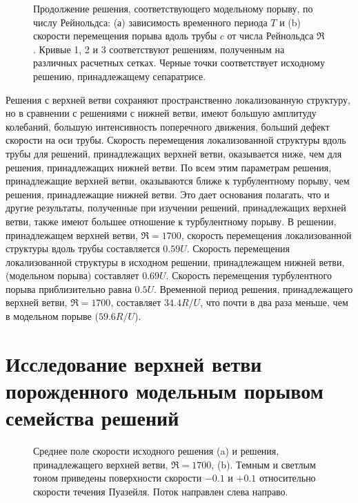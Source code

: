 \begin{figure}
\caption{Продолжение решения, соответствующего модельному порыву, по числу Рейнольдса: (а) зависимость временного периода $T$ и (b) скорости перемещения порыва вдоль трубы $c$ от числа Рейнольдса $\Re$. Кривые 1, 2 и 3 соответствуют решениям, полученным на различных расчетных сетках. Черные точки соответствует исходному решению, принадлежащему сепаратрисе.}
\label{local_contin_pic}
\end{figure}

Решения с верхней ветви сохраняют пространственно локализованную структуру, но в сравнении с решениями с нижней ветви, имеют большую амплитуду колебаний, большую интенсивность поперечного движения, больший дефект скорости на оси трубы. Скорость перемещения локализованной структуры вдоль трубы для решений, принадлежащих верхней ветви, оказывается ниже, чем для решения, принадлежащих нижней ветви. По всем этим параметрам решения, принадлежащие верхней ветви, оказываются ближе к турбулентному порыву, чем решения, принадлежащие нижней ветви. Это дает основания полагать, что и другие результаты, полученные при изучении решений, принадлежащих верхней ветви, также имеют большее отношение к турбулентному порыву. В решении, принадлежащем верхней ветви, $\Re = 1700$, скорость перемещения локализованной структуры вдоль трубы составляется $0.59U$. Скорость перемещения локализованной структуры в исходном решении, принадлежащем нижней ветви, (модельном порыва) составляет $0.69U$. Скорость перемещения турбулентного порыва приблизительно равна $0.5U$. Временной период решения, принадлежащего верхней ветви, $\Re = 1700$, составляет $34.4 R/U$, что почти в два раза меньше, чем в модельном порыве ($59.6R/U$). 

\section{Исследование верхней ветви порожденного модельным порывом семейства решений}

\begin{figure}
\caption{Среднее поле скорости исходного решения (a) и решения, принадлежащего верхней ветви, $\Re=1700$, (b). Темным и светлым тоном приведены поверхности скорости $-0.1$ и $+0.1$ относительно скорости течения Пуазейля. Поток направлен слева направо.}
\label{3D_contin_cmp_pic}
\end{figure}

